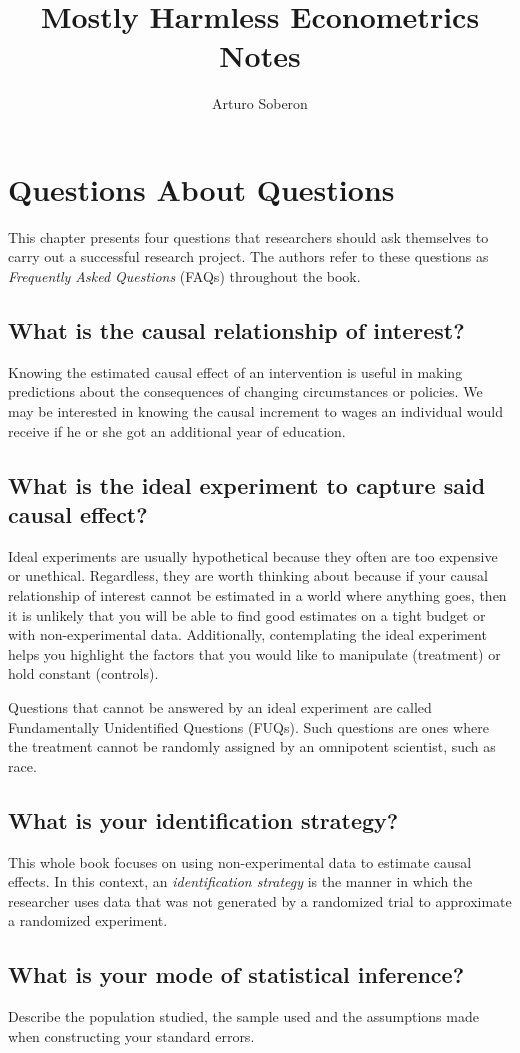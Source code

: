 \documentclass[12pt]{article}
\begin{document}
\title{Mostly Harmless Econometrics Notes}
\author{Arturo Soberon}
\date{}
\maketitle

\setcounter{section}{0}
\section{Questions About Questions}
This chapter presents four questions that researchers should ask themselves to
carry out a successful research project. The authors refer to these questions
as \textit{Frequently Asked Questions} (FAQs) throughout the book.

\subsection{What is the causal relationship of interest?}
Knowing the estimated causal effect of an intervention is useful in making
predictions about the consequences of changing circumstances or policies. We
may be interested in knowing the causal increment to wages an individual would
receive if he or she got an additional year of education.

\subsection{What is the ideal experiment to capture said causal effect?}
Ideal experiments are usually hypothetical because they often are too expensive
or unethical. Regardless, they are worth thinking about because if your causal
relationship of interest cannot be estimated in a world where anything goes,
then it is unlikely that you will be able to find good estimates on a tight
budget or with non-experimental data. Additionally, contemplating the ideal
experiment helps you highlight the factors that you would like to manipulate
(treatment) or hold constant (controls).

Questions that cannot be answered by an ideal experiment are called
Fundamentally Unidentified Questions (FUQs). Such questions are ones where
the treatment cannot be randomly assigned by an omnipotent scientist, such as
race.

\subsection{What is your identification strategy?}
This whole book focuses on using non-experimental data to estimate causal
effects. In this context, an \textit{identification strategy} is the manner
in which the researcher uses data that was not generated by a randomized trial
to approximate a randomized experiment.

\subsection{What is your mode of statistical inference?}
Describe the population studied, the sample used and the assumptions made when
constructing your standard errors.

\end{document}
